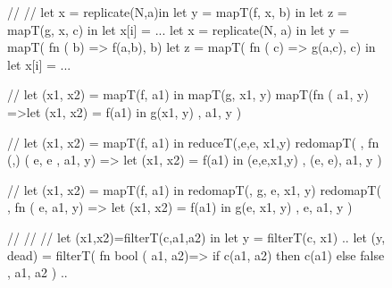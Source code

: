 \begin{figure}[bt]
\begin{colorcode}
// 
// 
let x = replicate(N,a)in 
let y = mapT(f, x, b) in
let z = mapT(g, x, c) in 
let x[i] = ...
    \emphh{\mymath{\equiv}}
let x = replicate(N, a) in 
let y = mapT( fn  ( b) 
              => f(a,b), b)
let z = mapT( fn  ( c) 
              => g(a,c), c)
in let x[i] = ...   


//  
let (x1, x2) = mapT(f, a1)
in  mapT(g, x1, y)   
    \emphh{\mymath{\equiv}}
mapT(fn \mymath{\beta} ( a1,  y)
  =>let (x1, x2) = f(a1)
    in  g(x1, y)
, a1, y )


//
let (x1, x2) = mapT(f, a1)
in  reduceT(\mymath{\oplus},e,e, x1,y)   
    \emphh{\mymath{\equiv}}
redomapT(\mymath{\oplus}
, fn (,) (  e,  e
             ,  a1, y)
   => let (x1, x2) = f(a1)
      in  \mymath{\oplus}(e,e,x1,y)
, (e, e), a1, y )


//
let (x1, x2) = mapT(f, a1)
in  redomapT(\mymath{\oplus}, g, e, x1, y)
    \emphh{\mymath{\equiv}}
redomapT(\mymath{\oplus}
, fn \mymath{\beta} (\mymath{\beta} e,  a1,  y)
   => let (x1, x2) = f(a1)
      in  g(e, x1, y)
, e, a1, y )

//
//
//
let (x1,x2)=filterT(c,a1,a2)
in  let y = filterT(c, x1) ..
    \emphh{\mymath{\equiv}}
let (y, dead) = filterT(
  fn bool ( a1, a2)=> 
      if   c(a1, a2) 
      then c(a1) 
      else false 
, a1, a2 ) ..


\end{colorcode}
\end{figure}
